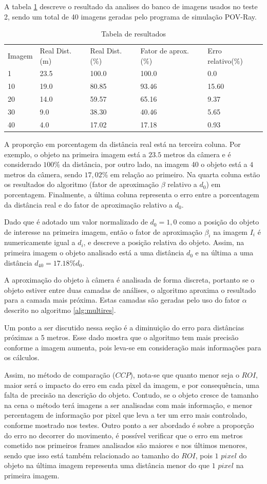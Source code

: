 A tabela \ref{tab:tab1} descreve o resultado da analises do banco 
de imagens usados no teste 2, sendo um total de 40 imagens geradas
pelo programa de simulação POV-Ray.
\begin{table}[H]
\setlength{\tabcolsep}{1 pt} 
\caption{Tabela de resultados}
\begin{tabular}{lllll}
Imagem & Real Dist.(m) & Real Dist.(\%) & Fator de aprox.(\%) & Erro relativo(\%)\\
1 & 23.5 & 100.0 & 100.0 & 0.0 \\
10 & 19.0 & 80.85 & 93.46 & 15.60 \\
20 & 14.0 & 59.57 & 65.16 & 9.37 \\
30 & 9.0 & 38.30 & 40.46 & 5.65 \\
40 & 4.0 & 17.02 & 17.18 & 0.93
\end{tabular}
\label{tab:tab1}
\end{table}
A proporção em porcentagem da distância real está na terceira coluna. Por exemplo, o objeto na primeira imagem
está a $23.5$ metros da câmera e é considerado $100$\% da distância, por outro lado, na imagem 40 o objeto está a
$4$ metros da câmera, sendo $17,02$\% em relação ao primeiro. Na quarta coluna estão os resultados do algoritmo (fator
de aproximação $\beta$ relativo a $d_0$) em porcentagem. Finalmente, a última coluna representa o erro entre a porcentagem da distância real e do
fator de aproximação relativo a $d_0$.

Dado que é adotado um valor normalizado de $d_0=1,0$ como a posição do objeto de interesse na primeira 
imagem, então o fator de aproximação $\beta_i$ na imagem $I_i$ é 
numericamente igual a $d_i$, e descreve a posição relativa do objeto.
Assim, na primeira imagem o objeto analisado está a uma distância $d_0$
e na última a uma distância $d_{40}=17.18\%d_0$.

A aproximação do objeto à câmera é analisada de forma discreta, portanto se o objeto
estiver entre duas camadas de análises, o algoritmo aproxima o resultado para
a camada mais próxima. Estas camadas são geradas pelo uso do fator $\alpha$
descrito no algoritmo \ref{alg:multires}.

Um ponto a ser discutido nessa seção é a diminuição do erro para distâncias próximas a 5 metros. Esse dado 
mostra que o algoritmo tem mais precisão conforme a imagem aumenta, pois leva-se em consideração mais informações
para os cálculos.

Assim, no método de comparação ($CCP$), nota-se que quanto menor seja o $ROI$, 
maior será o impacto do erro em cada pixel da imagem, 
e por consequência, uma falta de precisão na descrição do objeto. Contudo, se o objeto cresce de tamanho na cena
o método terá imagens a ser analisadas com mais informação, e menor percentagem de informação por pixel
que leva a ter um erro mais controlado, conforme
mostrado nos testes. Outro ponto a ser abordado é sobre a proporção do erro no decorrer do movimento, é possível
verificar que o erro em metros cometido nos primeiros frames analisados são maiores e nos últimos menores, sendo que
isso está também relacionado ao tamanho do $ROI$, pois $1$ $pixel$ do objeto na última imagem representa uma distância
menor do que $1$ $pixel$ na primeira imagem. 

